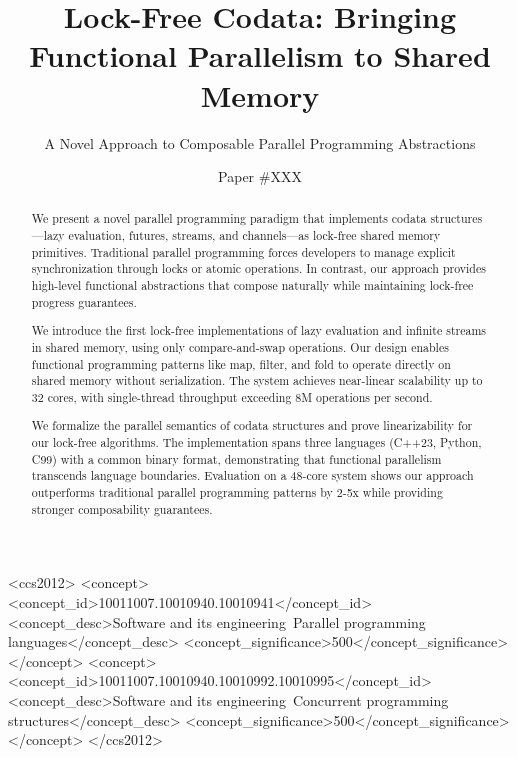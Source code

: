 \documentclass[sigconf,review,anonymous]{acmart}
\begin{document}
\title{Lock-Free Codata: Bringing Functional Parallelism to Shared Memory}
\subtitle{A Novel Approach to Composable Parallel Programming Abstractions}

\author{Paper \#XXX}

\begin{abstract}
We present a novel parallel programming paradigm that implements codata structures---lazy evaluation, futures, streams, and channels---as lock-free shared memory primitives. Traditional parallel programming forces developers to manage explicit synchronization through locks or atomic operations. In contrast, our approach provides high-level functional abstractions that compose naturally while maintaining lock-free progress guarantees.

We introduce the first lock-free implementations of lazy evaluation and infinite streams in shared memory, using only compare-and-swap operations. Our design enables functional programming patterns like map, filter, and fold to operate directly on shared memory without serialization. The system achieves near-linear scalability up to 32 cores, with single-thread throughput exceeding 8M operations per second.

We formalize the parallel semantics of codata structures and prove linearizability for our lock-free algorithms. The implementation spans three languages (C++23, Python, C99) with a common binary format, demonstrating that functional parallelism transcends language boundaries. Evaluation on a 48-core system shows our approach outperforms traditional parallel programming patterns by 2-5x while providing stronger composability guarantees.
\end{abstract}

\begin{CCSXML}
<ccs2012>
<concept>
<concept_id>10011007.10010940.10010941</concept_id>
<concept_desc>Software and its engineering~Parallel programming languages</concept_desc>
<concept_significance>500</concept_significance>
</concept>
<concept>
<concept_id>10011007.10010940.10010992.10010995</concept_id>
<concept_desc>Software and its engineering~Concurrent programming structures</concept_desc>
<concept_significance>500</concept_significance>
</concept>
</ccs2012>
\end{CCSXML}


\end{document}
